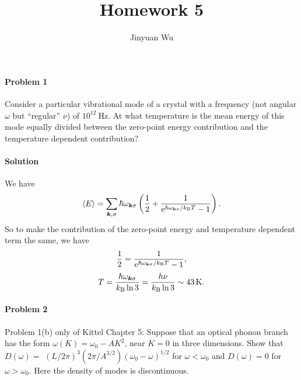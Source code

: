 \documentclass[hyperref, a4paper]{article}
\title{Homework 5}
\author{Jinyuan Wu}
\newcommand*{\ee}{\mathrm{e}}
\begin{document}
\maketitle

\paragraph{Problem 1} Consider a particular vibrational mode of a crystal with a frequency (not angular $\omega$ but ``regular'' $\nu$) of $10^{12} \mathrm{~Hz}$. At what temperature is the mean energy of this mode equally divided between the zero-point energy contribution and the temperature dependent contribution?

\paragraph{Solution} We have 
\begin{equation}
    \expval{E} = \sum_{\vb*{k}, \sigma} \hbar \omega_{\vb*{k} \sigma}  
    \left( \frac{1}{2} + \frac{1}{\ee^{{\hbar \omega_{\vb*{k} \sigma}} / {k_{\text{B}} T}} - 1} \right).
\end{equation}
So to make the contribution of the zero-point energy and temperature dependent term the same,
we have 
\[
    \frac{1}{2} = \frac{1}{\ee^{{\hbar \omega_{\vb*{k} \sigma}} / {k_{\text{B}} T}} - 1},
\]
\begin{equation}
    T = \frac{\hbar \omega_{\vb*{k} \sigma}}{k_{\text{B}} \ln 3} = \frac{h \nu}{k_{\text{B}} \ln 3} 
    \sim \SI{43}{K}.
\end{equation}

\paragraph{Problem 2} Problem 1(b) only of Kittel Chapter 5: Suppose that an optical phonon branch has the form $\omega(K)=\omega_0-A K^2$, near $K=0$ in three dimensions. Show that $D(\omega)=$ $(L / 2 \pi)^3\left(2 \pi / A^{3 / 2}\right)\left(\omega_0-\omega\right)^{1 / 2}$ for $\omega<\omega_0$ and $D(\omega)=0$ for $\omega>\omega_0$. Here the density of modes is discontinuous.
\end{document}
